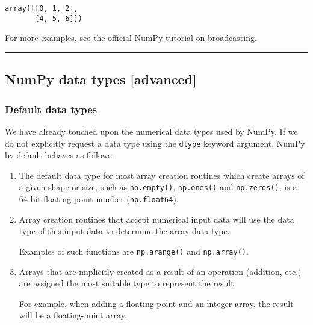 \documentclass[10pt]{scrartcl}
\makeatletter
\newcommand{\boxspacing}{\kern\kvtcb@left@rule\kern\kvtcb@boxsep}
\newcommand{\prompt}[4]{
        {\ttfamily\llap{{\color{#2}[#3]:\hspace{3pt}#4}}\vspace{-\baselineskip}}
    }
\makeatother
\begin{document}
            \begin{tcolorbox}[breakable, size=fbox, boxrule=.5pt, pad at break*=1mm, opacityfill=0]
\prompt{Out}{outcolor}{46}{\boxspacing}
\begin{Verbatim}[commandchars=\\\{\}]
array([[0, 1, 2],
       [4, 5, 6]])
\end{Verbatim}
\end{tcolorbox}
        
    For more examples, see the official NumPy
\href{https://numpy.org/doc/stable/user/theory.broadcasting.html}{tutorial}
on broadcasting.

    \begin{center}\rule{0.5\linewidth}{0.5pt}\end{center}

\hypertarget{numpy-data-types-advanced}{%
\subsection{NumPy data types
{[}advanced{]}}\label{numpy-data-types-advanced}}

\hypertarget{default-data-types}{%
\subsubsection{Default data types}\label{default-data-types}}

We have already touched upon the numerical data types used by NumPy. If
we do not explicitly request a data type using the \texttt{dtype}
keyword argument, NumPy by default behaves as follows:

\begin{enumerate}
\def\labelenumi{\arabic{enumi}.}
\item
  The default data type for most array creation routines which create
  arrays of a given shape or size, such as \texttt{np.empty()},
  \texttt{np.ones()} and \texttt{np.zeros()}, is a 64-bit floating-point
  number (\texttt{np.float64}).
\item
  Array creation routines that accept numerical input data will use the
  data type of this input data to determine the array data type.

  Examples of such functions are \texttt{np.arange()} and
  \texttt{np.array()}.
\item
  Arrays that are implicitly created as a result of an operation
  (addition, etc.) are assigned the most suitable type to represent the
  result.

  For example, when adding a floating-point and an integer array, the
  result will be a floating-point array.
\end{enumerate}
\end{document}
